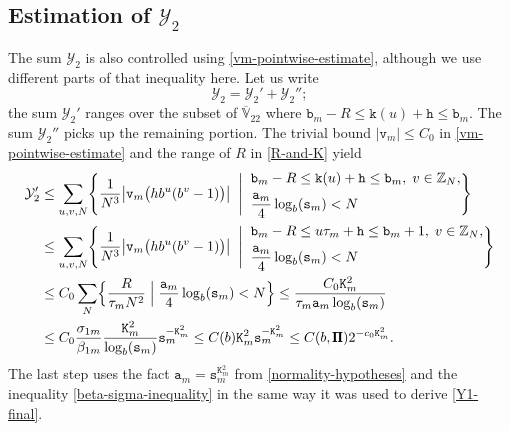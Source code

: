\documentclass[12pt, twoside]{article}
\theoremstyle{definition}
\numberwithin{equation}{section}
\begin{document}
\subsection{Estimation of $\mathcal Y_2$}
The sum $\mathcal Y_2$ is also controlled using \eqref{vm-pointwise-estimate}, although we use different parts of that inequality here.  
Let us write  
\begin{equation} \mathcal Y_2 = \mathcal Y_{2}' + \mathcal Y_{2}''; \label{Y2-decomp} \end{equation} 
the sum $\mathcal Y_2'$ ranges over the subset of $\overline{\mathbb V}_{22}$ where $\mathtt b_m - R \leq \mathtt k(u) + \mathtt h \le \mathtt b_m$. The sum $\mathcal Y_{2}''$ picks up the remaining portion. The trivial bound $|\mathtt v_m| \leq C_0$ in \eqref{vm-pointwise-estimate} and the range of $R$ in \eqref{R-and-K} yield  
\begin{align} 
\mathcal Y_{2}' & \leq \sum_{u, v, N} \Biggl\{\frac{1}{N^3}\bigl| \mathtt v_m \bigl(hb^u(b^v-1) \bigr) \bigr| \; \; \Biggl| \; \; \begin{aligned} & \mathtt b_m - R \leq \mathtt k(u) + \mathtt h \leq  \mathtt b_m, \; v \in \mathbb Z_N, \\  &\frac{\mathtt a_m}{4} \log_b (\mathtt s_m) < N  \end{aligned} \Biggr\} \nonumber \\ 
&\leq \sum_{u, v, N} \Biggl\{\frac{1}{N^3}\bigl| \mathtt v_m \bigl(hb^u(b^v-1) \bigr) \bigr| \; \; \Biggl| \; \; \begin{aligned} & \mathtt b_m - R \leq u\tau_m + \mathtt h \leq  \mathtt b_m + 1, \; v \in \mathbb Z_N, \\  &\frac{\mathtt a_m}{4} \log_b (\mathtt s_m) < N  \end{aligned} \Biggr\} \nonumber \\
&\leq C_0 \sum_N \Bigl\{\frac{R}{\tau_m N^2} \; \Bigl| \; \frac{\mathtt a_m}{4} \log_b (\mathtt s_m) < N  \Bigr\} \leq   \frac{C_0 \mathtt K_m^2}{\tau_m \mathtt a_m \log_b(\mathtt s_m)} \nonumber \\ &\leq C_0 \frac{\sigma_{1m}}{\beta_{1m}} \frac{\mathtt K_m^2}{\log_b (\mathtt s_m)} \mathtt s_m^{-\mathtt K_m^2} \leq C(b) \mathtt K_m^2 \mathtt s_m^{-\mathtt K_m^2} \leq C(b, \pmb{\Pi}) 2^{-c_0 \mathtt K_m^2}. \label{Y2-final-1} 
\end{align} 
The last step uses the fact $\mathtt a_m = \mathtt s_m^{\mathtt K_m^2}$ from \eqref{normality-hypotheses} and the inequality \eqref{beta-sigma-inequality} in the same way it was used to derive \eqref{Y1-final}. 
\end{document}
